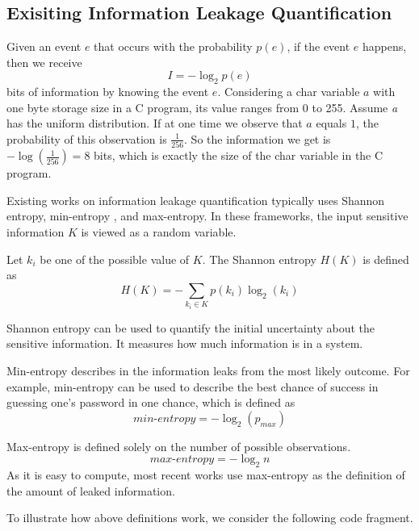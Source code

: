 \subsection{Exisiting Information Leakage Quantification}
 
Given an event $e$ that occurs with the probability $p(e)$, if the event $e$ happens, 
then we receive
\begin{displaymath}
    I = - \log_2p(e)
\end{displaymath}
bits of information by knowing the event $e$.
Considering a char variable $a$ with one byte storage size in a C program, its value 
ranges from 0 to 255.  Assume
 \textit{a} has the uniform distribution. If at one time we observe that $a$
equals $1$, the probability of this observation is $\frac{1}{256}$. So the information we get is 
$-\log(\frac{1}{256}) = 8$ bits, which is exactly the size of the char variable in the C program.

Existing works on information leakage quantification typically uses Shannon entropy,  
min-entropy \cite{10.1007/978-3-642-00596-1_21}, and max-entropy.
In these frameworks, the input sensitive
information $K$ is viewed as a random variable. 

Let $k_i$ be one of the possible
value of $K$. The Shannon entropy $H(K)$ is defined as
\begin{displaymath}
    H(K) = - \sum_{k_i {\in} K}p(k_i)\log_2(k_i)
\end{displaymath}

Shannon entropy can be used to quantify the initial uncertainty about the sensitive
information. It measures how much information is in a system.

Min-entropy describes in the information leaks from the most likely outcome.
For example, min-entropy can be used to describe the best chance of success in guessing 
one's password in one chance, which is defined as 
\begin{displaymath}
    \mathit{min\text{-}entropy} = - \log_2(p_{max})
\end{displaymath}

Max-entropy is defined solely on the number of possible observations. 
\begin{displaymath}
    \mathit{max\text{-}entropy} = -\log_2{n}
\end{displaymath}
As it is easy to compute, most recent works use 
max-entropy as the definition of the amount of leaked information.

To illustrate how above definitions work, we consider the following
code fragment. 

